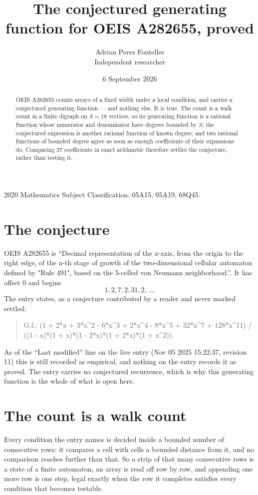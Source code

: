 \documentclass[11pt,a4paper]{article}
\title{The conjectured generating function for OEIS A282655, proved}
\author{Adrian Perez Fontelles\\ \small Independent researcher}
\date{6 September 2026}
\theoremstyle{plain}
\theoremstyle{definition}
\begin{document}
\maketitle

\begin{abstract}
OEIS A282655 counts arrays of a fixed width under a local condition, and carries a conjectured
generating function --- and nothing else. It is true. The count is a walk count in a finite
digraph on $S=18$ vertices, so its generating function is a rational function whose numerator
and denominator have degrees bounded by $S$; the conjectured expression is another rational
function of known degree; and two rational functions of bounded degree agree as soon as enough
coefficients of their expansions do. Comparing $37$ coefficients in exact arithmetic
therefore settles the conjecture, rather than testing it.
\end{abstract}

\noindent\small 2020 Mathematics Subject Classification. 05A15, 05A19, 68Q45.\normalsize

\section{The conjecture}

OEIS A282655 is ``Decimal representation of the x-axis, from the origin to the right edge, of the n-th stage of growth of the two-dimensional cellular automaton defined by "Rule 491", based on the 5-celled von Neumann neighborhood.''. It has offset $0$ and begins
\[
1, 2, 7, 2, 31, 2,\ \dots
\]
The entry states, as a conjecture contributed by a reader and never marked settled:
\begin{quote}
G.f.: (1 + 2*x + 3*x\^{}2 - 6*x\^{}3 + 2*x\^{}4 - 8*x\^{}5 + 32*x\^{}7 + 128*x\^{}11) / ((1 - x)*(1 + x)*(1 - 2*x)*(1 + 2*x)*(1 + x\^{}2)).
\end{quote}
As of the ``Last modified'' line on the live entry (Nov 05 2025 15:22:37, revision 11) this is still
recorded as empirical, and nothing on the entry records it as proved. The entry carries no
conjectured recurrence, which is why this generating function is the whole of what is open
here.

\section{The count is a walk count}

Every condition the entry names is decided inside a bounded number of consecutive rows: it
compares a cell with cells a bounded distance from it, and no comparison reaches further than
that. So a strip of that many consecutive rows is a state of a finite automaton, an array is
read off row by row, and appending one more row is one step, legal exactly when the row it
completes satisfies every condition that becomes testable.
\end{document}
